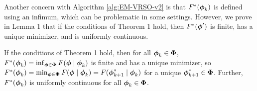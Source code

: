 Another concern with Algorithm \ref{alg:EM-VRSO-v2} is that $F^{*}(\boldsymbol{\phi}_{k})$ is defined using an infimum, which can be problematic in some settings. However, we prove in Lemma 1 that if the conditions of Theorem 1 hold, then $F^*(\boldsymbol{\phi}')$ is finite, has a unique minimizer, and is uniformly continuous.

\begin{lemma}
    If the conditions of Theorem 1 hold, then for all $\boldsymbol{\phi}_k \in \boldsymbol{\Phi}$, $F^{*}(\boldsymbol{\phi}_k) = \inf_{\boldsymbol{\phi} \in \boldsymbol{\Phi}} F(\boldsymbol{\phi} \mid \boldsymbol{\phi}_k)$ is finite and has a unique minimizer, so $F^*(\boldsymbol{\phi}_k) = \min_{\boldsymbol{\phi} \in \boldsymbol{\Phi}} F(\boldsymbol{\phi} \mid \boldsymbol{\phi}_k) = F(\boldsymbol{\phi}_{k+1}^* \mid \boldsymbol{\phi}_k)$ for a unique $\boldsymbol{\phi}_{k+1}^* \in \boldsymbol{\Phi}$. Further, $F^*(\boldsymbol{\phi}_k)$ is uniformly continuous for all $\boldsymbol{\phi}_k \in \boldsymbol{\Phi}$.
\end{lemma}

